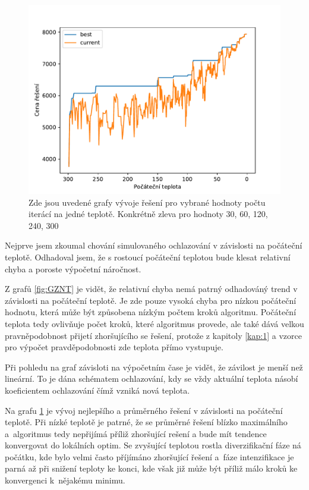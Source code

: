 \documentclass[11pt]{article}
\begin{document}
\begin{figure}
\begin{minipage}[c]{0.49\textwidth}
        \centering \includegraphics[width=\textwidth]{img/T300.pdf} 
    \end{minipage}
   \caption{Zde jsou uvedené grafy vývoje řešení pro vybrané hodnoty počtu iterácí na jedné teplotě. Konkrétně zleva pro hodnoty 30, 60, 120, 240, 300}\label{fig:GVPT}
\end{figure} 

Nejprve jsem zkoumal chování simulovaného ochlazování v závislosti na počáteční teplotě. Odhadoval jsem, že s rostoucí počáteční teplotou bude klesat relativní chyba a poroste výpočetní náročnost. 

Z grafů \ref{fig:GZNT} je vidět, že relativní chyba nemá patrný odhadováný trend v závislosti na počáteční teplotě. Je zde pouze vysoká chyba pro nízkou počáteční hodnotu, která může být způsobena nízkým počtem kroků algoritmu. Počáteční teplota tedy ovlivňuje počet kroků, které algoritmus provede, ale také dává velkou pravněpodobnost přijetí zhoršujícího se řešení, protože z kapitoly \ref{kap:1} a vzorce pro výpočet pravděpodobnosti zde teplota přímo vystupuje. 

Při pohledu na graf závisloti na výpočetním čase je vidět, že závilost je menší než lineární. To je dána schématem ochlazování, kdy se vždy aktuální teplota násobí koeficientem ochlazování čímž vzniká nová teplota. 

Na grafu \ref{fig:GVPT} je vývoj nejlepšího a průměrného řešení v závislosti na počáteční teplotě. Při nízké teplotě je patrné, že se průměrné řešení blízko maximálního a~algoritmus tedy nepřijímá příliž zhoršující rešení a bude mít tendence konvergovat do lokálních optim. Se zvyšující teplotou rostla diverzifikační fáze ná počátku, kde bylo velmi často příjímáno zhoršující řešení a~fáze intenzifikace je parná až při snižení teploty ke konci, kde však již může být příliž málo kroků ke konvergenci k~nějakému minimu. 
\end{document}
